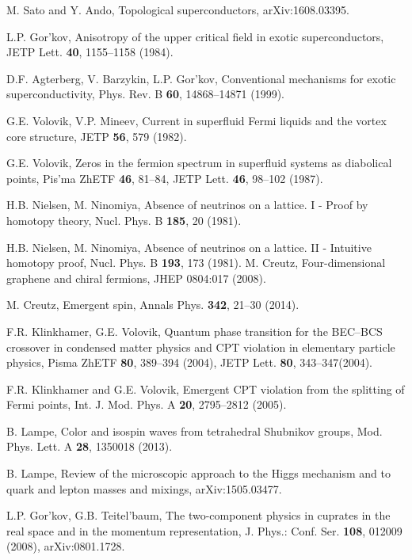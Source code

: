 \documentclass[prb,
superscriptaddress,showpacs,amsmath,amssymb]{revtex4}
\begin{document}
\begin{thebibliography}{99}
M. Sato and Y. Ando,
Topological superconductors,
arXiv:1608.03395.

L.P. Gor'kov,  
Anisotropy of the upper critical field in exotic superconductors, 
JETP Lett. {\bf 40}, 1155--1158 (1984).

D.F. Agterberg, V. Barzykin, L.P. Gor’kov, 
Conventional mechanisms for exotic superconductivity,
Phys. Rev. B {\bf 60}, 14868--14871 (1999).


 G.E. Volovik, V.P. Mineev, 
Current in  superfluid Fermi liquids and the vortex core structure,
JETP {\bf 56}, 579  (1982).

G.E. Volovik, 
Zeros in the fermion spectrum in superfluid systems as diabolical points,
Pis'ma ZhETF {\bf 46}, 81--84, JETP Lett. {\bf 46}, 98--102 (1987).

H.B. Nielsen, M. Ninomiya, 
Absence of neutrinos on a lattice.  I - Proof by homotopy theory, 
Nucl. Phys. B \textbf{185}, 20  (1981).

H.B. Nielsen, M. Ninomiya, 
Absence of neutrinos on a lattice. II - Intuitive homotopy proof,  
Nucl. Phys. B \textbf{193}, 173 (1981). 
M. Creutz,
Four-dimensional graphene and chiral fermions,
JHEP 0804:017 (2008).

M. Creutz, 
Emergent spin, Annals Phys. {\bf 342},  21--30  (2014).


F.R. Klinkhamer, G.E. Volovik,
Quantum phase transition for the BEC--BCS crossover in condensed matter physics and CPT violation in elementary particle physics,
Pisma ZhETF {\bf 80}, 389--394 (2004), JETP Lett. {\bf 80}, 343--347(2004).

F.R. Klinkhamer and G.E. Volovik, 
Emergent CPT violation from the splitting of Fermi points, 
Int. J. Mod. Phys. A {\bf 20}, 2795--2812 (2005).
 
B. Lampe,
Color and isospin waves from tetrahedral Shubnikov groups,
 Mod. Phys. Lett. A {\bf 28}, 1350018 (2013).

B. Lampe,
Review of the microscopic approach to the Higgs mechanism and to quark and lepton masses and mixings,
arXiv:1505.03477.

L.P. Gor'kov, G.B. Teitel'baum, 
The two-component physics in cuprates in the real space and in the momentum representation, 
J. Phys.: Conf. Ser. {\bf 108}, 012009 (2008), arXiv:0801.1728.


\end{thebibliography}
\end{document}
